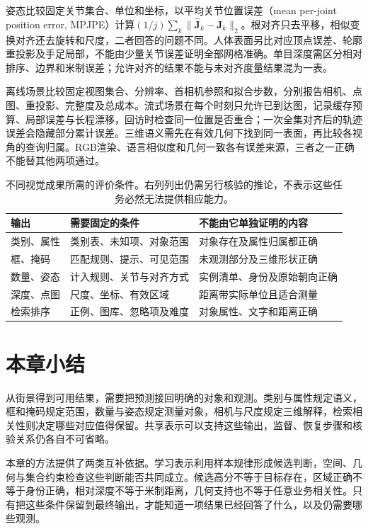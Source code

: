 姿态比较固定关节集合、单位和坐标，以平均关节位置误差（mean per-joint position error, MPJPE）计算$(1/j)\sum_k\lVert\hat{\bm J}_k-\bm J_k\rVert_2$。根对齐只去平移，相似变换对齐还去旋转和尺度，二者回答的问题不同。人体表面另比对应顶点误差、轮廓重投影及手足局部，不能由少量关节误差证明全部网格准确。单目深度需区分相对排序、边界和米制误差；允许对齐的结果不能与未对齐度量结果混为一表。

离线场景比较固定视图集合、分辨率、首相机参照和拟合步数，分别报告相机、点图、重投影、完整度及总成本。流式场景在每个时刻只允许已到达图，记录缓存预算、局部误差与长程漂移，回访时检查同一位置是否重合；一次全集对齐后的轨迹误差会隐藏部分累计误差。三维语义需先在有效几何下找到同一表面，再比较各视角的查询归属。RGB渲染、语言相似度和几何一致各有误差来源，三者之一正确不能替其他两项通过。

\begin{table}[htbp]
 \centering
 \small
 \begin{tabularx}{\linewidth}{@{}lXX@{}}
 \toprule
 输出 & 需要固定的条件 & 不能由它单独证明的内容\\
 \midrule
 类别、属性 & 类别表、未知项、对象范围 & 对象存在及属性归属都正确\\
 框、掩码 & 匹配规则、提示、可见范围 & 未观测部分及三维形状正确\\
 数量、姿态 & 计入规则、关节与对齐方式 & 实例清单、身份及原始朝向正确\\
 深度、点图 & 尺度、坐标、有效区域 & 距离带实际单位且适合测量\\
 检索排序 & 正例、图库、忽略项及难度 & 对象属性、文字和距离正确\\
 \bottomrule
 \end{tabularx}
 \caption{不同视觉成果所需的评价条件。右列列出仍需另行核验的推论，不表示这些任务必然无法提供相应能力。}
 \label{tab:vision-recognition-protocols}
\end{table}

\section{本章小结}
\label{sec:vision-recognition-summary}

从街景得到可用结果，需要把预测接回明确的对象和观测。类别与属性规定语义，框和掩码规定范围，数量与姿态规定测量对象，相机与尺度规定三维解释，检索相关性则决定哪些对应值得保留。共享表示可以支持这些输出，监督、恢复步骤和核验关系仍各自不可省略。

本章的方法提供了两类互补依据。学习表示利用样本规律形成候选判断，空间、几何与集合约束检查这些判断能否共同成立。候选高分不等于目标存在，区域正确不等于身份正确，相对深度不等于米制距离，几何支持也不等于任意业务相关性。只有把这些条件保留到最终输出，才能知道一项结果已经回答了什么，以及仍需要哪些观测。

